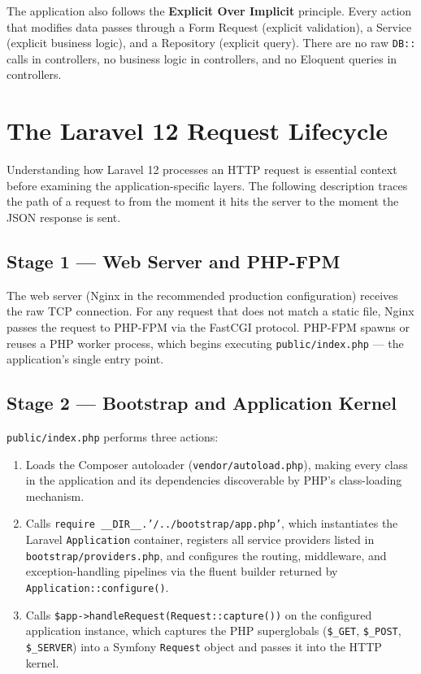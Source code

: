 The application also follows the \textbf{Explicit Over Implicit} principle.
Every action that modifies data passes through a Form Request (explicit
validation), a Service (explicit business logic), and a Repository
(explicit query). There are no raw \texttt{DB::} calls in controllers,
no business logic in controllers, and no Eloquent queries in controllers.

\section{The Laravel 12 Request Lifecycle}
\label{sec:request-lifecycle}

Understanding how Laravel 12 processes an HTTP request is essential context
before examining the application-specific layers. The following description
traces the path of a request to
 from the moment it hits the
server to the moment the JSON response is sent.

\subsection{Stage 1 --- Web Server and PHP-FPM}

The web server (Nginx in the recommended production configuration) receives
the raw TCP connection. For any request that does not match a static file,
Nginx passes the request to PHP-FPM via the FastCGI protocol. PHP-FPM
spawns or reuses a PHP worker process, which begins executing
\texttt{public/index.php} --- the application's single entry point.

\subsection{Stage 2 --- Bootstrap and Application Kernel}

\texttt{public/index.php} performs three actions:

\begin{enumerate}
  \item Loads the Composer autoloader (\texttt{vendor/autoload.php}),
    making every class in the application and its dependencies
    discoverable by PHP's class-loading mechanism.
  \item Calls \texttt{require \_\_DIR\_\_.'/../bootstrap/app.php'}, which
    instantiates the Laravel \texttt{Application} container, registers all
    service providers listed in \texttt{bootstrap/providers.php}, and
    configures the routing, middleware, and exception-handling pipelines
    via the fluent builder returned by \texttt{Application::configure()}.
  \item Calls \texttt{\$app->handleRequest(Request::capture())} on the
    configured application instance, which captures the PHP superglobals
    (\texttt{\$\_GET}, \texttt{\$\_POST}, \texttt{\$\_SERVER}) into a
    Symfony \texttt{Request} object and passes it into the HTTP kernel.
\end{enumerate}

